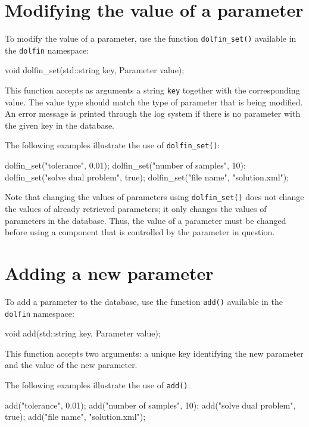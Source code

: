 \section{Modifying the value of a parameter}

To modify the value of a parameter, use the function \texttt{dolfin\_set()}
available in the \texttt{dolfin} namespace:
\begin{code}
void dolfin_set(std::string key, Parameter value);
\end{code}
This function accepts as arguments a string \texttt{key} together with
the corresponding value. The value type should match the type of
parameter that is being modified. An error message is
printed through the log system if there is no parameter with the given
key in the database.

The following examples illustrate
the use of \texttt{dolfin\_set()}:
\begin{code}
dolfin_set("tolerance", 0.01);
dolfin_set("number of samples", 10);
dolfin_set("solve dual problem", true);
dolfin_set("file name", "solution.xml");
\end{code}

Note that changing the values of parameters using
\texttt{dolfin\_set()} does not change the values of already retrieved
parameters; it only changes the values of parameters in the
database. Thus, the value of a parameter must be changed before using
a component that is controlled by the parameter in question.

\section{Adding a new parameter}

To add a parameter to the database, use the function
\texttt{add()} available in the \texttt{dolfin}
namespace:
\begin{code}
void add(std::string key, Parameter value);
\end{code}
This function accepts two arguments:
a unique key identifying the new parameter and the value of the new
parameter.

The following examples illustrate the use of
\texttt{add()}:
\begin{code}
add("tolerance", 0.01);
add("number of samples", 10);
add("solve dual problem", true);
add("file name", "solution.xml");
\end{code}

